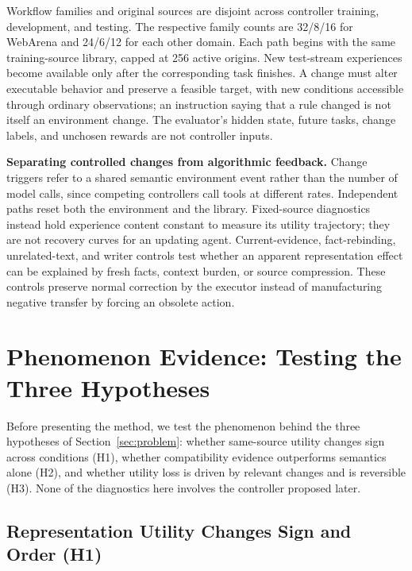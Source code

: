 \documentclass[sigconf,anonymous,review]{acmart}
\theoremstyle{zhplain}
\begin{document}
Workflow families and original sources are disjoint across controller training, development, and testing. The respective family counts are 32/8/16 for WebArena and 24/6/12 for each other domain. Each path begins with the same training-source library, capped at 256 active origins. New test-stream experiences become available only after the corresponding task finishes. A change must alter executable behavior and preserve a feasible target, with new conditions accessible through ordinary observations; an instruction saying that a rule changed is not itself an environment change. The evaluator's hidden state, future tasks, change labels, and unchosen rewards are not controller inputs.

\textbf{Separating controlled changes from algorithmic feedback.} Change triggers refer to a shared semantic environment event rather than the number of model calls, since competing controllers call tools at different rates. Independent paths reset both the environment and the library. Fixed-source diagnostics instead hold experience content constant to measure its utility trajectory; they are not recovery curves for an updating agent. Current-evidence, fact-rebinding, unrelated-text, and writer controls test whether an apparent representation effect can be explained by fresh facts, context burden, or source compression. These controls preserve normal correction by the executor instead of manufacturing negative transfer by forcing an obsolete action.


\section{Phenomenon Evidence: Testing the Three Hypotheses}
\label{sec:phenomenon}
Before presenting the method, we test the phenomenon behind the three hypotheses of Section~\ref{sec:problem}: whether same-source utility changes sign across conditions (H1), whether compatibility evidence outperforms semantics alone (H2), and whether utility loss is driven by relevant changes and is reversible (H3). None of the diagnostics here involves the controller proposed later.

\subsection{Representation Utility Changes Sign and Order (H1)}
\end{document}
